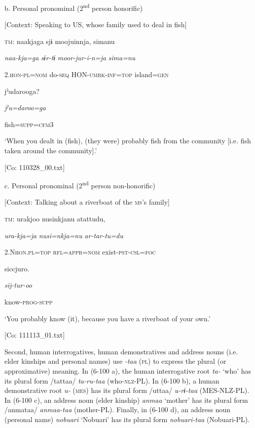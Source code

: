   b.  Personal pronominal (2\textsuperscript{nd} person honorific)

    [Context: Speaking to US, whose family used to deal in fish]

    \textsc{tm}:  naakjaga  sjɨ  moojuinnja,  simanu

      \textit{naa-kja=ga}  \textit{sɨr-tɨ}  \textit{moor-jur-i-n=ja}  \textit{sima=nu}

      2.\textsc{hon}-\textsc{pl}=\textsc{nom}  do-\textsc{seq}  HON-\textsc{umrk}-\textsc{inf}=\textsc{top}  island=\textsc{gen}

      jˀudarooga?

      \textit{jˀu=daroo=ga}

      fish=\textsc{supp}=\textsc{cfm}3

      ‘When you dealt in (fish), (they were) probably fish from the community [i.e. fish taken around the community].’

      [Co: 110328\_00.txt]

  c.  Personal pronominal (2\textsuperscript{nd} person non-honorific)

    [Context: Talking about a riverboat of the \textsc{ms}’s family]

    \textsc{tm}:  urakjoo  nusinkjanu  atattudu,

      \textit{ura-kja=ja}  \textit{nusi=nkja=nu}  \textit{ar-tar-tu=du}

      2.N\textsc{hon}.\textsc{pl}=\textsc{top}  \textsc{rfl}=\textsc{appr}=\textsc{nom}  exist-\textsc{pst}-\textsc{csl}=\textsc{foc}

      siccjuro.

      \textit{sij-tur-oo}

      know-\textsc{prog}-\textsc{supp}

      ‘You probably know (it), because you have a riverboat of your own.’

      [Co: 111113\_01.txt]

  Second, human interrogatives, human demonstratives and address nouns (i.e. elder kinships and personal names) use \textit{{}-taa} (\textsc{pl}) to express the plural (or approximative) meaning. In (6-100 a), the human interrogative root \textit{ta-} ‘who’ has its plural form /tattaa/ \textit{ta-ru-taa} (who-\textsc{nlz}-PL). In (6-100 b), a human demonstrative root \textit{u-} (\textsc{mes}) has its plural form /uttaa/ \textit{u-rɨ-taa} (MES-NLZ-PL). In (6-100 c), an address noun (elder kinship) \textit{anmaa} ‘mother’ has its plural form /anmataa/ \textit{anmaa-taa} (mother-PL). Finally, in (6-100 d), an address noun (personal name) \textit{nobuari} ‘Nobuari’ has its plural form \textit{nobuari-taa} (Nobuari-PL).

